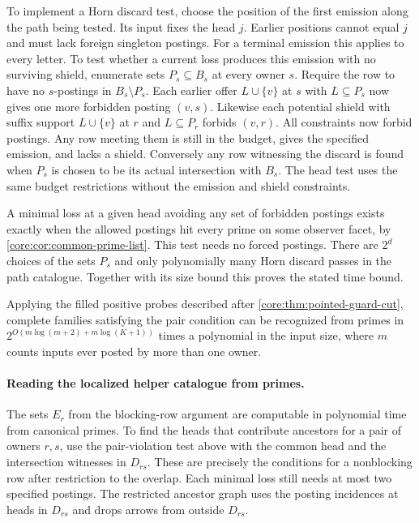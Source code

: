 To implement a Horn discard test, choose the position of the
first emission along the path being tested. Its input fixes the
head $j$. Earlier positions cannot equal $j$ and must lack
foreign singleton postings. For a terminal emission this applies
to every letter. To test whether a current loss produces this
emission with no surviving shield, enumerate sets $P_s\subseteq
B_s$ at every owner $s$. Require the row to have no $s$-postings
in $B_s\setminus P_s$. Each earlier offer $L\cup\{v\}$ at $s$
with $L\subseteq P_s$ now gives one more forbidden posting
$(v,s)$. Likewise each potential shield with suffix support
$L\cup\{v\}$ at $r$ and $L\subseteq P_r$ forbids $(v,r)$.
All constraints now forbid postings. Any row meeting them is
still in the budget, gives the specified emission, and lacks a
shield. Conversely any row witnessing the discard is found
when $P_s$ is chosen to be its actual intersection with $B_s$.
The head test uses the same budget restrictions without the
emission and shield constraints.

A minimal loss at a given head avoiding any set of forbidden
postings exists exactly when the allowed postings hit every
prime on some observer facet, by
\cref{core:cor:common-prime-list}. This test needs no forced
postings. There are $2^d$ choices of the sets $P_s$ and only
polynomially many Horn discard passes in the path catalogue.
Together with its size bound this proves the stated time bound.

Applying the filled positive probes described after
\cref{core:thm:pointed-guard-cut}, complete families satisfying the pair condition
can be recognized from primes in
$2^{O(m\log(m+2)+m\log(K+1))}$ times a polynomial in the input
size, where $m$ counts inputs ever posted by more than one owner.

\paragraph{Reading the localized helper catalogue from primes.}
The sets $E_r$ from the blocking-row argument are computable
in polynomial time from canonical primes. To find the heads
that contribute ancestors for a pair of owners $r,s$, use
the pair-violation test above with the common head and the
intersection witnesses in $D_{rs}$. These are precisely the
conditions for a nonblocking row after restriction to the overlap.
Each minimal loss still needs at most two specified postings.
The restricted ancestor graph uses the posting incidences at
heads in $D_{rs}$ and drops arrows from outside $D_{rs}$.

